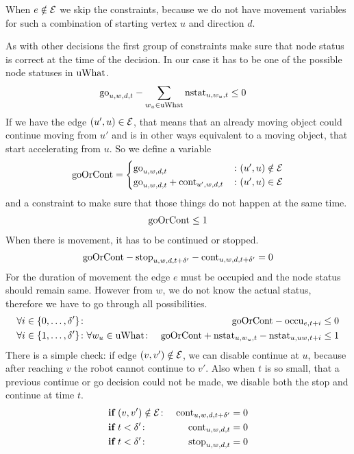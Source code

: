 When $e \notin \mathcal{E}$ we skip the constraints, because we do not have movement
variables for such a combination of starting vertex $u$ and direction $d$.

As with other decisions the first group of constraints make sure that node
status is correct at the time of the decision. In our case it has to be one of
the possible node statuses in $\mathrm{uWhat}$.
\begin{align}
    & \mathrm{go}_{u,w,d,t} - \sum_{w_u \in \mathrm{uWhat}} \mathrm{nstat}_{u,w_u,t} \leq 0
\end{align}
If we have the edge $(u',u) \in \mathcal{E}$, that means that an already moving object
could continue moving from $u'$ and is in other ways equivalent to a moving
object, that start accelerating from $u$. So we define a variable
\begin{align*}
    \mathrm{goOrCont} = \begin{cases}
        \mathrm{go}_{u,w,d,t} &\colon (u',u) \notin \mathcal{E}\\
        \mathrm{go}_{u,w,d,t} + \mathrm{cont}_{u',w,d,t} &\colon (u',u) \in \mathcal{E}
    \end{cases}
\end{align*}
and a constraint to make sure that those things do not happen at the same time.
\begin{align}
    \mathrm{goOrCont} \leq 1
\end{align}
When there is movement, it has to be continued or stopped.
\begin{align}
    \mathrm{goOrCont} - \mathrm{stop}_{u,w,d,t+\delta'} - \mathrm{cont}_{u,w,d,t+\delta'} = 0
\end{align}
For the duration of movement the edge $e$ must be occupied and the node status
should remain same. However from $w$, we do not know the actual status,
therefore we have to go through all possibilities.
\begin{align}
    &\forall i \in \{0,\ldots,\delta'\}\colon & \mathrm{goOrCont} - \mathrm{occu}_{e,t+i} \leq 0\\
    &\forall i \in \{1,\ldots,\delta'\}\colon \forall w_u \in \mathrm{uWhat}\colon &
    \mathrm{goOrCont} + \mathrm{nstat}_{u,w_u,t} - \mathrm{nstat}_{u,uw,t+i} \leq 1
\end{align}
There is a simple check: if edge $(v,v') \notin \mathcal{E}$, we can disable continue at
$u$, because after reaching $v$ the robot cannot continue to $v'$. Also when
$t$ is so small, that a previous continue or go decision could not be made, we
disable both the stop and continue at time $t$.
\begin{align}
    &\text{\bf if}\ (v,v') \notin \mathcal{E} \colon &\mathrm{cont}_{u,w,d,t+\delta'} = 0\\
    &\text{\bf if}\ t < \delta' \colon &\mathrm{cont}_{u,w,d,t} = 0\\
    &\text{\bf if}\ t < \delta' \colon &\mathrm{stop}_{u,w,d,t} = 0
\end{align}
